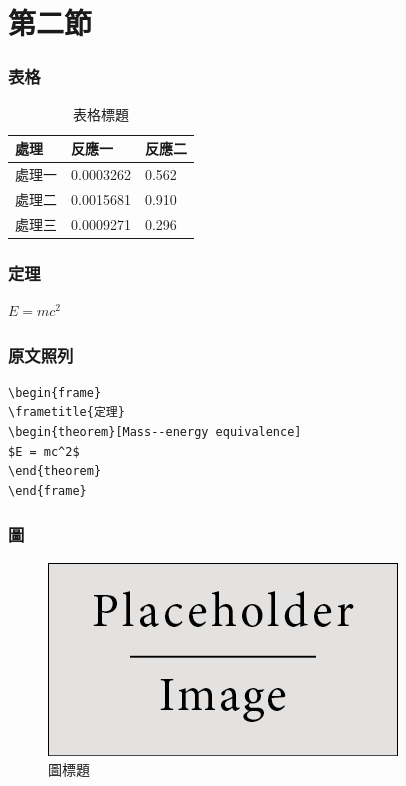 \documentclass{beamer}
\begin{document}
\section{第二節}

\begin{frame}
\frametitle{\iyan 表格}
\begin{table}
\begin{tabular}{l l l}
\toprule
\textbf{處理} & \textbf{反應一} & \textbf{反應二}\\
\midrule
處理一 & 0.0003262 & 0.562 \\
處理二 & 0.0015681 & 0.910 \\
處理三 & 0.0009271 & 0.296 \\
\bottomrule
\end{tabular}
\caption{表格標題}
\end{table}
\end{frame}


\begin{frame}
\frametitle{\iyan 定理}
\begin{theorem}
$E = mc^2$
\end{theorem}
\end{frame}


\begin{frame}[fragile] %
\frametitle{\iyan 原文照列}
\begin{example}
\begin{verbatim}
\begin{frame}
\frametitle{定理}
\begin{theorem}[Mass--energy equivalence]
$E = mc^2$
\end{theorem}
\end{frame}\end{verbatim}
\end{example}
\end{frame}


\begin{frame}
\frametitle{\iyan 圖}
\begin{figure}
 \includegraphics[width=0.6\linewidth, scale=.8]{placeholder.jpg}
 \caption{圖標題}
\end{figure}
\end{frame}
\end{document}
